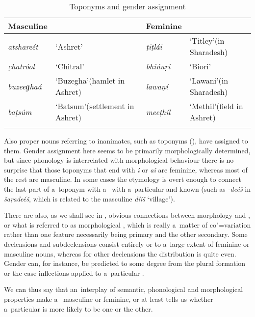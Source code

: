 \begin{table}[b]
\caption{Toponyms and {gender} assignment}
\begin{tabularx}{\textwidth}{ l Q l Q }
\lsptoprule
Masculine &
&
Feminine &
\\\midrule
\textit{atshareét} &
`Ashret' &
\textit{ṭiṭlái} &
`Titley'\newline (in Sharadesh)\\
\textit{c̣hatróol} &
`Chitral' &
\textit{bhiúuṛi} &
`Biori'\\
\textit{buzeeɡhaá} &
`Buzegha'\newline (hamlet in Ashret) &
\textit{lawaṇí} &
`Lawani'\newline (in Sharadesh)\\
\textit{baṭsúm} &
`Batsum'\newline (settlement in Ashret) &
\textit{meeṭhíl} &
`Methil'\newline (field in Ashret)\\\lspbottomrule
\end{tabularx}
\label{tab:4-3}
\end{table}


Also proper nouns referring to inanimates, such as toponyms (), have  assigned to them. Gender assignment here seems to be primarily morphologically determined, but since phonology is interrelated with morphological behaviour there is no surprise that those toponyms that end with \textit{i} or \textit{ai} are feminine, whereas most of the rest are masculine. In some cases the etymology is overt enough to connect the last part of a~toponym with a~ with a~particular and known  (such as \textit{-deéš} in \textit{šaṛadeéš}, which is related to the masculine  \textit{díiš} `village').


There are also, as we shall see in , obvious connections between  morphology and , or what is referred to as morphological  \citep[34--50]{corbett1991}, which is really a~matter of co"=variation rather than one feature necessarily being primary and the other secondary. Some declensions and subdeclensions consist entirely or to a~large extent of feminine or masculine nouns, whereas for other declensions the  distribution is quite even. Gender can, for instance, be predicted to some degree from the plural formation or the case inflections applied to a~particular .


We can thus say that an~interplay of semantic, phonological and morphological properties make a~ masculine or feminine, or at least tells us whether a~particular  is more likely to be one or the other. 


